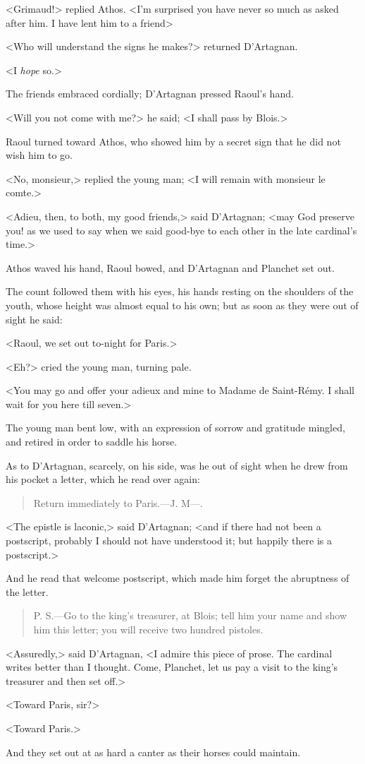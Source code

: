<Grimaud!> replied Athos. <I'm surprised you have never so much as asked after him. I have lent him to a friend\longdash>

<Who will understand the signs he makes?> returned D'Artagnan.

<I \emph{hope} so.>

The friends embraced cordially; D'Artagnan pressed Raoul's hand.

<Will you not come with me?> he said; <I shall pass by Blois.>

Raoul turned toward Athos, who showed him by a secret sign that he did not wish him to go.

<No, monsieur,> replied the young man; <I will remain with monsieur le comte.>

<Adieu, then, to both, my good friends,> said D'Artagnan; <may God preserve you! as we used to say when we said good-bye to each other in the late cardinal's time.>

Athos waved his hand, Raoul bowed, and D'Artagnan and Planchet set out.

The count followed them with his eyes, his hands resting on the shoulders of the youth, whose height was almost equal to his own; but as soon as they were out of sight he said:

<Raoul, we set out to-night for Paris.>

<Eh?> cried the young man, turning pale.

<You may go and offer your adieux and mine to Madame de Saint-Rémy. I shall wait for you here till seven.>

The young man bent low, with an expression of sorrow and gratitude mingled, and retired in order to saddle his horse.

As to D'Artagnan, scarcely, on his side, was he out of sight when he drew from his pocket a letter, which he read over again:  
\begin{quote}
	Return immediately to Paris.—J. M—.
	\end{quote}

<The epistle is laconic,> said D'Artagnan; <and if there had not been a postscript, probably I should not have understood it; but happily there is a postscript.>

And he read that welcome postscript, which made him forget the abruptness of the letter. 

\begin{quote}
P. S.—Go to the king's treasurer, at Blois; tell him your name and show him this letter; you will receive two hundred pistoles.
	\end{quote}

<Assuredly,> said D'Artagnan, <I admire this piece of prose. The cardinal writes better than I thought. Come, Planchet, let us pay a visit to the king's treasurer and then set off.>

<Toward Paris, sir?>

<Toward Paris.>

And they set out at as hard a canter as their horses could maintain. 